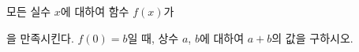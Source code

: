 모든 실수 $x$에 대하여 함수 $f(x)$가\par\smallskip{}\par\smallskip\noindent 을 만족시킨다. $f(0)=b$일 때, 상수 $a$, $b$에 대하여 $a+b$의 값을 구하시오.
